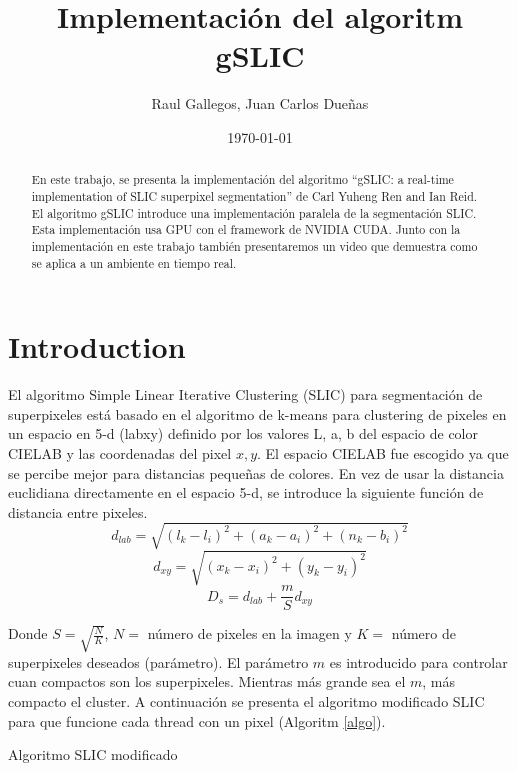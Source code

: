 \documentclass[11pt, oneside]{article}   	%
\title{Implementaci\'on del algoritm gSLIC}
\author{Raul Gallegos, Juan Carlos Due\~nas}
\date{\today}							%
\begin{document}
\maketitle
\begin{abstract}
En este trabajo, se presenta la implementaci\'on del algoritmo ``gSLIC: a real-time implementation of SLIC superpixel segmentation'' de Carl Yuheng Ren and Ian Reid\cite{YHRen_gSLIC}.
El algoritmo gSLIC introduce una implementaci\'on paralela de la segmentaci\'on SLIC. Esta implementaci\'on usa GPU con el framework de NVIDIA CUDA. Junto con la implementaci\'on en este trabajo tambi\'en presentaremos un video que demuestra como se aplica a un ambiente en tiempo real. 
\end{abstract}

\section{Introduction}
El algoritmo Simple Linear Iterative Clustering (SLIC) para segmentaci\'on de superpixeles est\'a basado en el algoritmo de k-means para clustering de pixeles en un espacio en 5-d (labxy) definido por los valores L, a, b del espacio de color CIELAB y las coordenadas del pixel $x,y$. El espacio CIELAB fue escogido ya que se percibe mejor para distancias pequeñas de colores. En vez de usar la distancia euclidiana directamente en el espacio 5-d, se introduce la siguiente función de distancia entre pixeles.
$$
d_{lab}=\sqrt{(l_k-l_i)^2+(a_k-a_i)^2+(n_k-b_i)^2}
$$
$$
d_{xy}=\sqrt{(x_k-x_i)^2+(y_k-y_i)^2}
$$
$$
D_s=d_{lab}+\frac{m}{S}d_{xy}
$$

Donde $S = \sqrt{\frac{N}{K}}$, $N=$ n\'umero de pixeles en la imagen y $K=$ n\'umero de superpixeles deseados (par\'ametro). El par\'ametro $m$ es introducido para controlar cuan compactos son los superpixeles. Mientras m\'as grande sea el $m$, m\'as compacto el cluster. A continuaci\'on se presenta el algoritmo modificado SLIC para que funcione cada thread con un pixel (Algoritm \ref{algo}).
\begin{algorithm}
\caption{Algoritmo SLIC modificado}
\label{algo}
\begin{algorithmic}[1]
\EndFor
{}
\EndFor
{}
\EndWhile
{}
\end{algorithmic}
\end{algorithm}
\end{document}
